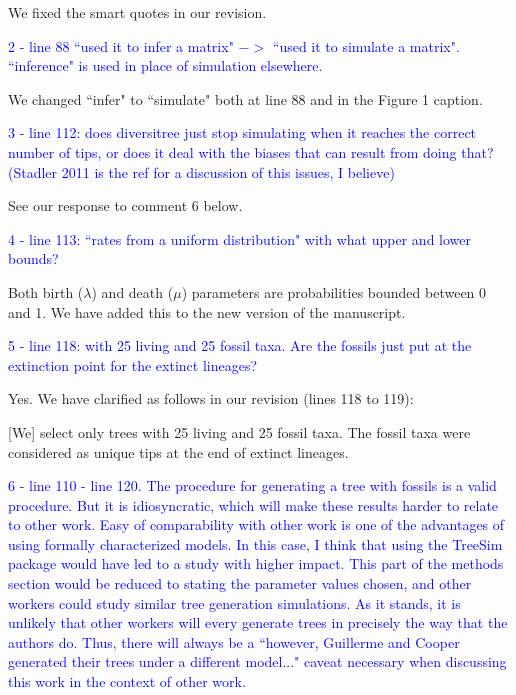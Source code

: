 \documentclass[11pt]{letter}
\begin{document}
\begin{letter}{}
We fixed the smart quotes in our revision.


\textcolor{blue}{2 - line 88 ``used it to infer a matrix" $->$ ``used it to simulate a matrix". ``inference" is used in place of simulation elsewhere.}

We changed ``infer" to ``simulate" both at line 88 and in the Figure 1 caption.


\textcolor{blue}{3 - line 112: does diversitree just stop simulating when it reaches the correct number of tips, or does it deal with the biases that can result from doing that? (Stadler 2011 is the ref for a discussion of this issues, I believe)}

See our response to comment 6 below.


\textcolor{blue}{4 - line 113: ``rates from a uniform distribution" with what upper and lower bounds?}

Both birth ($\lambda$) and death ($\mu$) parameters are probabilities bounded between 0 and 1. We have added this to the new version of the manuscript.


\textcolor{blue}{5 - line 118: with 25 living and 25 fossil taxa. Are the fossils just put at the extinction point for the extinct lineages?}

Yes. We have clarified as follows in our revision (lines 118 to 119):

\hfill\begin{minipage}{\dimexpr\textwidth-1cm}
[We] select only trees with 25 living and 25 fossil taxa. The fossil taxa were considered as unique tips at the end of extinct lineages.
\end{minipage}


\textcolor{blue}{6 - line 110 - line 120. The procedure for generating a tree with fossils is a valid procedure. But it is idiosyncratic, which will make these results harder to relate to other work. Easy of comparability with other work is one of the advantages of using formally characterized models. In this case, I think that using the TreeSim package would have led to a study with higher impact. This part of the methods section would be reduced to stating the parameter values chosen, and other workers could study similar tree generation simulations. As it stands, it is unlikely that other workers will every generate trees in precisely the way that the authors do. Thus, there will always be a ``however, Guillerme and Cooper generated their trees under a different model..." caveat necessary when discussing this work in the context of other work.}


\end{letter}
\end{document}
